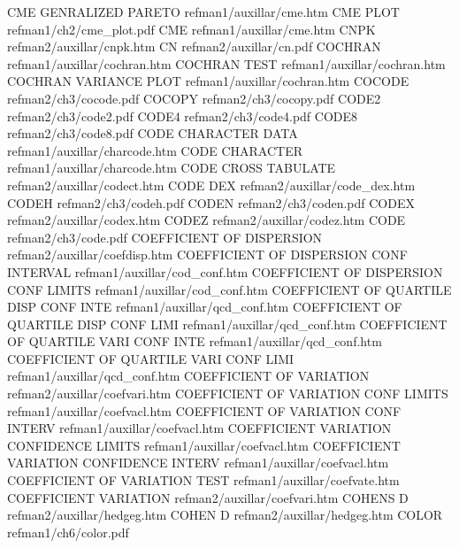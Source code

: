 CME GENRALIZED PARETO                   refman1/auxillar/cme.htm
CME PLOT                                refman1/ch2/cme_plot.pdf
CME                                     refman1/auxillar/cme.htm
CNPK                                    refman2/auxillar/cnpk.htm
CN                                      refman2/auxillar/cn.pdf
COCHRAN                                 refman1/auxillar/cochran.htm
COCHRAN TEST                            refman1/auxillar/cochran.htm
COCHRAN VARIANCE PLOT                   refman1/auxillar/cochran.htm
COCODE                                  refman2/ch3/cocode.pdf
COCOPY                                  refman2/ch3/cocopy.pdf
CODE2                                   refman2/ch3/code2.pdf
CODE4                                   refman2/ch3/code4.pdf
CODE8                                   refman2/ch3/code8.pdf
CODE CHARACTER DATA                     refman1/auxillar/charcode.htm
CODE CHARACTER                          refman1/auxillar/charcode.htm
CODE CROSS TABULATE                     refman2/auxillar/codect.htm
CODE DEX                                refman2/auxillar/code_dex.htm
CODEH                                   refman2/ch3/codeh.pdf
CODEN                                   refman2/ch3/coden.pdf
CODEX                                   refman2/auxillar/codex.htm
CODEZ                                   refman2/auxillar/codez.htm
CODE                                    refman2/ch3/code.pdf
COEFFICIENT OF DISPERSION               refman2/auxillar/coefdisp.htm
COEFFICIENT OF DISPERSION CONF INTERVAL refman1/auxillar/cod_conf.htm
COEFFICIENT OF DISPERSION CONF LIMITS   refman1/auxillar/cod_conf.htm
COEFFICIENT OF QUARTILE DISP CONF INTE  refman1/auxillar/qcd_conf.htm
COEFFICIENT OF QUARTILE DISP CONF LIMI  refman1/auxillar/qcd_conf.htm
COEFFICIENT OF QUARTILE VARI CONF INTE  refman1/auxillar/qcd_conf.htm
COEFFICIENT OF QUARTILE VARI CONF LIMI  refman1/auxillar/qcd_conf.htm
COEFFICIENT OF VARIATION                refman2/auxillar/coefvari.htm
COEFFICIENT OF VARIATION CONF LIMITS    refman1/auxillar/coefvacl.htm
COEFFICIENT OF VARIATION CONF INTERV    refman1/auxillar/coefvacl.htm
COEFFICIENT VARIATION CONFIDENCE LIMITS refman1/auxillar/coefvacl.htm
COEFFICIENT VARIATION CONFIDENCE INTERV refman1/auxillar/coefvacl.htm
COEFFICIENT OF VARIATION TEST           refman1/auxillar/coefvate.htm
COEFFICIENT VARIATION                   refman2/auxillar/coefvari.htm
COHENS D                                refman2/auxillar/hedgeg.htm
COHEN D                                 refman2/auxillar/hedgeg.htm
COLOR                                   refman1/ch6/color.pdf
